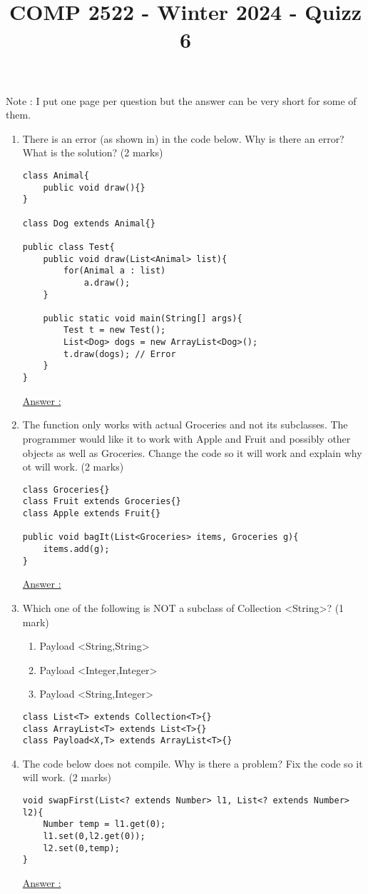 \documentclass{article}
\author{}
\date{}
\title{COMP 2522 - Winter 2024 - Quizz 6}
\begin{document}
\maketitle
Note : I put one page per question but the answer can be very short for some of them.
\begin{enumerate}
	\item There is an error (as shown in) in the code below. Why is there an error? What is the solution? (2 marks)
	\begin{lstlisting}
class Animal{
	public void draw(){}
}

class Dog extends Animal{}

public class Test{
	public void draw(List<Animal> list){
		for(Animal a : list)
			a.draw();
	}
	
	public static void main(String[] args){
		Test t = new Test();
		List<Dog> dogs = new ArrayList<Dog>();
		t.draw(dogs); // Error
	}
}
	\end{lstlisting}
	\underline{Answer :}
	\newpage
	\item The function only works with actual Groceries and not its subclasses. The programmer would like it to work with Apple and Fruit and possibly other objects as well as Groceries. Change the code so it will work and explain why ot will work. (2 marks)
	\begin{lstlisting}
class Groceries{}
class Fruit extends Groceries{}
class Apple extends Fruit{}

public void bagIt(List<Groceries> items, Groceries g){
	items.add(g);
}
	\end{lstlisting}
	\underline{Answer :}
	\newpage
	\item Which one of the following is NOT a subclass of Collection \textless String\textgreater? (1 mark)
	\begin{enumerate}
		\item Payload \textless String,String\textgreater
		\item Payload \textless Integer,Integer\textgreater
		\item Payload \textless String,Integer\textgreater
	\end{enumerate}
	\begin{lstlisting}
class List<T> extends Collection<T>{}
class ArrayList<T> extends List<T>{}
class Payload<X,T> extends ArrayList<T>{}
	\end{lstlisting}
	\item The code below does not compile. Why is there a problem? Fix the code so it will work. (2 marks)
	\begin{lstlisting}
void swapFirst(List<? extends Number> l1, List<? extends Number> l2){
	Number temp = l1.get(0);
	l1.set(0,l2.get(0));
	l2.set(0,temp);
}
	\end{lstlisting}
	\underline{Answer :}
\end{enumerate}
\end{document}
